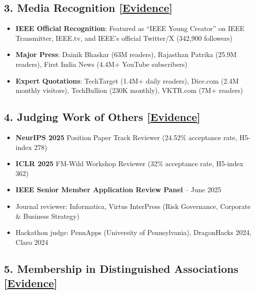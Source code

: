\documentclass[11pt,letterpaper]{article}
\begin{document}
\subsection*{3. Media Recognition [\href{https://drive.google.com/drive/folders/1QLb3IlX1ue6Wc24gqAIDBbaiWseFTD0E?usp=drive_link}{Evidence}]}

\begin{itemize}
    \item \textbf{IEEE Official Recognition}: Featured as ``IEEE Young Creator'' on IEEE Transmitter, IEEE.tv, and IEEE's official Twitter/X (342,900 followers)
    \item \textbf{Major Press}: Dainik Bhaskar (63M readers), Rajasthan Patrika (25.9M readers), First India News (4.4M+ YouTube subscribers)
    \item \textbf{Expert Quotations}: TechTarget (1.4M+ daily readers), Dice.com (2.4M monthly visitors), TechBullion (230K monthly), VKTR.com (7M+ readers)
\end{itemize}

\subsection*{4. Judging Work of Others [\href{https://drive.google.com/drive/folders/1lOullfOG43OJJo1Az8DtnGiJBvKWVibZ?usp=drive_link}{Evidence}]}

\begin{itemize}
    \item \textbf{NeurIPS 2025} Position Paper Track Reviewer (24.52\% acceptance rate, H5-index 278)
    \item \textbf{ICLR 2025} FM-Wild Workshop Reviewer (32\% acceptance rate, H5-index 362)
    \item \textbf{IEEE Senior Member Application Review Panel} -- June 2025
    \item Journal reviewer: Informatica, Virtus InterPress (Risk Governance, Corporate \& Business Strategy)
    \item Hackathon judge: PennApps (University of Pennsylvania), DragonHacks 2024, Claro 2024
\end{itemize}

\subsection*{5. Membership in Distinguished Associations [\href{https://drive.google.com/drive/folders/1lMiMgpDHPDqvhqXAT3Hyg75ScH7qxyTA?usp=sharing}{Evidence}]}
\end{document}
